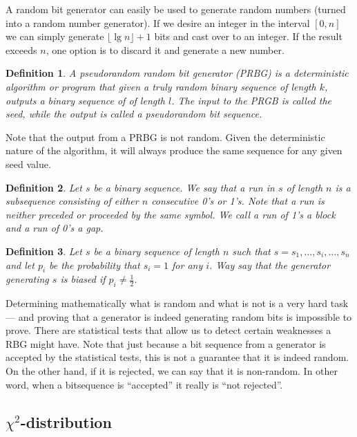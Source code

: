 \documentclass[a4paper]{article}           %
\newtheorem{mydef}{Definition}
\begin{document}
A random bit generator can easily be used to generate random numbers (turned into a random number generator). If we desire an integer in the interval $[0, n]$ we can simply generate $\lfloor \lg n \rfloor + 1$ bits and cast over to an integer. If the result exceeds $n$, one option is to discard it and generate a new number. 

\begin{mydef}
  
  A pseudorandom random bit generator (PRBG) is a deterministic algorithm or program that given a truly random binary sequence of length $k$, outputs a binary sequence of of length $l$. The input to the PRGB is called the seed, while the output is called a pseudorandom bit sequence. 

  
\end{mydef}

Note that the output from a PRBG is not random. Given the deterministic nature of the algorithm, it will always produce the same sequence for any given seed value. 

\begin{mydef}
Let $s$ be a binary sequence. We say that a run in $s$ of length $n$ is a subsequence consisting of either $n$ consecutive 0's or 1's. Note that a run is neither preceded or proceeded by the same symbol. We call a run of 1's a block and a run of 0's a gap. 
\end{mydef}

\begin{mydef}
  Let $s$ be a binary sequence of length $n$ such that $s = s_1, \ldots, s_i, \ldots, s_n$ and let $p_i$ be the probability that $s_i = 1$ for any $i$. Way say that the generator generating $s$ is biased if $p_i \neq \frac 1 2$. 
\end{mydef}

Determining mathematically what is random and what is not is a very hard task --- and proving that a generator is indeed generating random bits is impossible to prove\cite{menezes1996}. There are statistical tests that allow us to detect certain weaknesses a RBG might have. Note that just because a bit sequence from a generator is accepted by the statistical tests, this is not a guarantee that it is indeed random. On the other hand, if it is rejected, we can say that it is non-random. In other word, when a bitsequence is ``accepted'' it really is ``not rejected''. 


\subsection{$\chi^2$-distribution}
\end{document}
